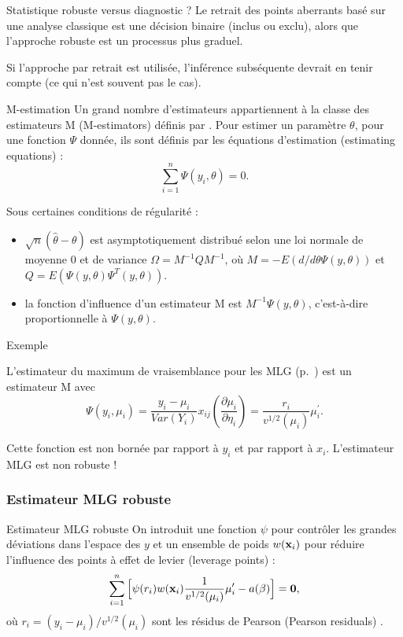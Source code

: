 \documentclass{BeamerTemplate}
\begin{document}
\begin{refsection}
\begin{frame}{Statistique robuste versus diagnostic ?}
\bigskip
Le retrait des points aberrants basé sur une analyse classique est une décision binaire (inclus ou exclu), alors que l'approche robuste est un processus plus graduel.

\bigskip
Si l'approche par retrait est utilisée, l'inférence subséquente devrait en tenir compte (ce qui n'est souvent pas le cas).
\end{frame}

\begin{frame}{M-estimation}
Un grand nombre d'estimateurs appartiennent à la classe des {\color{blue}estimateurs M (M-estimators)} définis par . Pour estimer un paramètre $\theta$, pour une fonction $\Psi$ donnée, ils sont définis par les {\color{blue}équations d'estimation (estimating equations)} :
$$\sum_{i=1}^n \Psi(y_i,\theta) = 0.$$

Sous certaines conditions de régularité :
\begin{itemize}
\item $\sqrt{n} (\hat{\theta} - \theta)$ est asymptotiquement distribué selon une loi normale de moyenne 0 et de variance $\Omega = M^{-1} Q M^{-1}$, où $M=- E(d/ d \theta \Psi(y,\theta))$ et $Q= E (\Psi(y,\theta) \Psi^T(y,\theta))$.
\item la fonction d'influence d'un estimateur M est $M^{-1} \Psi(y,\theta)$, c'est-à-dire proportionnelle à $\Psi(y,\theta)$.
\end{itemize}

\end{frame}

\begin{frame}{Exemple}

L'{\color{blue}estimateur du maximum de vraisemblance pour les MLG} (p.~\pageref{EE.GLM}) est un estimateur M avec
$$\Psi(y_i,\mu_i) = \frac{y_i-\mu_i}{Var(Y_i)} x_{ij}
(\frac{\partial \mu_i}{\partial \eta_i}) = \frac{r_i}{v^{1/2}(\mu_i)} \mu_i^{\prime}.$$

\bigskip
Cette fonction est non bornée par rapport à $y_i$ et par rapport à $x_i$. L'estimateur MLG est {\color{blue}non robuste} !

\end{frame}

\subsubsection{Estimateur MLG robuste}

\begin{frame}{Estimateur MLG robuste}
On introduit une fonction $\psi$ pour contrôler les grandes déviations dans l'espace des $y$ et un ensemble de poids $w({\bf x}_i)$ pour réduire l'influence des points à effet de levier (leverage points) :
\begin{equation*}
\label{EE.eq}
\sum_{i=1}^n \Big[ \psi(r_i ) w({\bf x}_i)
\frac{1}{v^{1/2}(\mu_i)}  \mu_i^{\prime}  - a(\beta) \Big] = {\bf 0},
\end{equation*}
où $r_i = (y_i-\mu_i)/v^{1/2}(\mu_i)$ sont les résidus de Pearson (Pearson residuals) \cite{Cant:Ronc:2001a}.


\end{frame}
\end{refsection}
\end{document}
